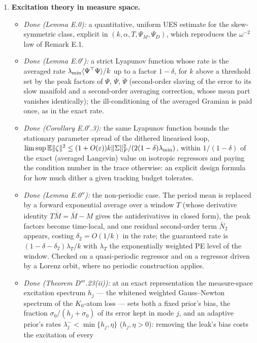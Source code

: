 \begin{enumerate}[label=\arabic*.,leftmargin=*]
\item \textbf{Excitation theory in measure space.}
  \begin{itemize}
    \item \emph{Done (Lemma E.0):} a quantitative, uniform UES estimate for the skew-symmetric class, explicit in
      $(k,\alpha,T,\Psi_M,\Psi_D)$, which reproduces the $\omega^{-2}$ law of Remark E.1.
    \item \emph{Done (Lemma E.0$'$):} a strict Lyapunov function whose rate is the averaged rate
      $\lambda_{\min}\langle\Psi^\top\Psi\rangle/k$ up to a factor $1-\delta$, for $k$ above a threshold set by the
      peak factors of $\Psi$, $\dot\Psi$, $\ddot\Psi$ (second-order slaving of the error to its slow manifold and a
      second-order averaging correction, whose mean part vanishes identically); the ill-conditioning of the averaged
      Gramian is paid once, as in the exact rate.
    \item \emph{Done (Corollary E.0$'$.3):} the same Lyapunov function bounds the stationary parameter spread of the
      dithered linearised loop,
      $\limsup\mathbb{E}\lVert \zeta\rVert^2\le(1+O(\varepsilon))k\lVert \Sigma\rVert_F^2/(2(1-\delta)\lambda_{\min})$, within
      $1/(1-\delta)$ of the exact (averaged Langevin) value on isotropic regressors and paying the condition number
      in the trace otherwise: an explicit design formula for how much dither a given tracking budget tolerates.
    \item \emph{Done (Lemma E.0$''$):} the non-periodic case. The period mean is replaced by a forward exponential
      average over a window $T$ (whose derivative identity $T\dot{\bar M}=\bar M-M$ gives the antiderivatives in
      closed form), the peak factors become time-local, and one residual second-order term $\bar N_2$ appears,
      costing $\delta_2=O(1/k)$ in the rate; the guaranteed rate is $(1-\delta-\delta_2)\lambda_T/k$ with
      $\lambda_T$ the exponentially weighted PE level of the window. Checked on a quasi-periodic regressor and on a
      regressor driven by a Lorenz orbit, where no periodic construction applies.
    \item \emph{Done (Theorem D$'''$.23(ii)):} at an exact representation the measure-space excitation spectrum
      $h_j$ --- the whitened weighted Gauss--Newton spectrum of the $K_0$-atom loss --- sets both a fixed prior's bias,
      the fraction $\sigma_0/(h_j + \sigma_0)$ of its error kept in mode $j$, and an adaptive prior's rates
      $\lambda_j^- < \min\{h_j,\eta\}$ ($h_j,\eta > 0$): removing the leak's bias costs the excitation of every

\end{itemize}
\end{enumerate}
